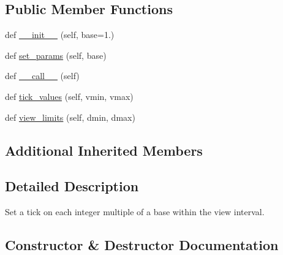 \subsection*{Public Member Functions}
\begin{DoxyCompactItemize}
\item 
def \hyperlink{classmatplotlib_1_1ticker_1_1MultipleLocator_a43545d4c0ec2bff4f2d14f4dccec1e14}{\+\_\+\+\_\+init\+\_\+\+\_\+} (self, base=1.)
\item 
def \hyperlink{classmatplotlib_1_1ticker_1_1MultipleLocator_ab4bb46893f74b17fcf259123559284f1}{set\+\_\+params} (self, base)
\item 
def \hyperlink{classmatplotlib_1_1ticker_1_1MultipleLocator_a0bce5d65cbc5f7525b7da579fa04b4f0}{\+\_\+\+\_\+call\+\_\+\+\_\+} (self)
\item 
def \hyperlink{classmatplotlib_1_1ticker_1_1MultipleLocator_a8e868b8741569b9594271c4eaee93524}{tick\+\_\+values} (self, vmin, vmax)
\item 
def \hyperlink{classmatplotlib_1_1ticker_1_1MultipleLocator_a1c06194caa2c4d1a43322868a58694f3}{view\+\_\+limits} (self, dmin, dmax)
\end{DoxyCompactItemize}
\subsection*{Additional Inherited Members}


\subsection{Detailed Description}
\begin{DoxyVerb}Set a tick on each integer multiple of a base within the view interval.
\end{DoxyVerb}
 

\subsection{Constructor \& Destructor Documentation}
\mbox{\label{classmatplotlib_1_1ticker_1_1MultipleLocator_a43545d4c0ec2bff4f2d14f4dccec1e14}} 
